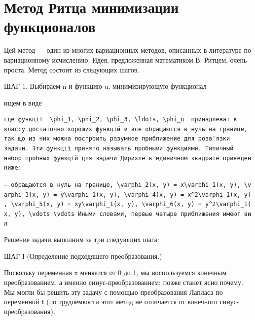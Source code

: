 \documentclass[
  ukrainian,
]{article}
\begin{document}
\section{Метод Ритца минимизации
функционалов}\label{ux43cux435ux442ux43eux434-ux440ux438ux442ux446ux430-ux43cux438ux43dux438ux43cux438ux437ux430ux446ux438ux438-ux444ux443ux43dux43aux446ux438ux43eux43dux430ux43bux43eux432}

Цей метод --- один из многих вариационных методов, описанных в
литературе по вариационному исчислению. Идея, предложенная математиком
В. Ритцем, очень проста. Метод состоит из следующих шагов.

ШАГ 1. Выбираем n и функцию u, минимизирующую функционал

ищем в виде

\begin{verbatim}
где функції  \phi_1, \phi_2, \phi_3, \ldots, \phi_n  принадлежат к классу достаточно хороших функцій и все обращаются в нуль на границе, так що из них можна построить разумное приближение для розв'язки задачи. Эти функції принято называть пробными функциями. Типичный набор пробных функцій для задачи Дирихле в единичном квадрате приведен ниже:
\end{verbatim}

\texttt{—\ обращаются\ в\ нуль\ на\ границе,\ \textquotesingle{}\textbackslash{}varphi\_2(x,\ y)\ =\ x\textbackslash{}varphi\_1(x,\ y),\textquotesingle{}\ \textquotesingle{}\textbackslash{}varphi\_3(x,\ y)\ =\ y\textbackslash{}varphi\_1(x,\ y),\textquotesingle{}\ \textquotesingle{}\textbackslash{}varphi\_4(x,\ y)\ =\ x\^{}2\textbackslash{}varphi\_1(x,\ y),\textquotesingle{}\ \textquotesingle{}\textbackslash{}varphi\_5(x,\ y)\ =\ xy\textbackslash{}varphi\_1(x,\ y),\textquotesingle{}\ \textquotesingle{}\textbackslash{}varphi\_6(x,\ y)\ =\ y\^{}2\textbackslash{}varphi\_1(x,\ y),\textquotesingle{}\ \textquotesingle{}\textbackslash{}vdots\textquotesingle{}\ \textquotesingle{}\textbackslash{}vdots\textquotesingle{}\ Иными\ словами,\ первые\ четыре\ приближения\ имеют\ вид}

Решение задачи выполним за три следующих шага:

ШАГ І (Определение подходящего преобразования.)

Поскольку переменная x меняется от 0 до 1, мы воспользуемся конечным
преобразованием, а именно синус-преобразованием; позже станет ясно
почему. Мы могли бы решить эту задачу с помощью преобразования Лапласа
по переменной t (по трудоемкости этот метод не отличается от конечного
синус-преобразования).
\end{document}
